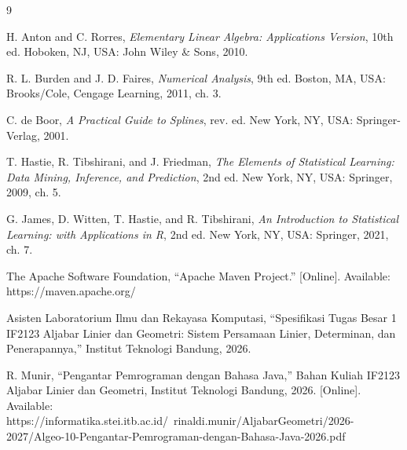 \clearpage
\begin{thebibliography}{9}

H. Anton and C. Rorres, \textit{Elementary Linear Algebra: Applications Version}, 10th ed. Hoboken, NJ, USA: John Wiley \& Sons, 2010.

R. L. Burden and J. D. Faires, \textit{Numerical Analysis}, 9th ed. Boston, MA, USA: Brooks/Cole, Cengage Learning, 2011, ch. 3.

C. de Boor, \textit{A Practical Guide to Splines}, rev. ed. New York, NY, USA: Springer-Verlag, 2001.

T. Hastie, R. Tibshirani, and J. Friedman, \textit{The Elements of Statistical Learning: Data Mining, Inference, and Prediction}, 2nd ed. New York, NY, USA: Springer, 2009, ch. 5.

G. James, D. Witten, T. Hastie, and R. Tibshirani, \textit{An Introduction to Statistical Learning: with Applications in R}, 2nd ed. New York, NY, USA: Springer, 2021, ch. 7.

The Apache Software Foundation, ``Apache Maven Project.'' [Online]. Available: https://maven.apache.org/

Asisten Laboratorium Ilmu dan Rekayasa Komputasi, ``Spesifikasi Tugas Besar 1 IF2123 Aljabar Linier dan Geometri: Sistem Persamaan Linier, Determinan, dan Penerapannya,'' Institut Teknologi Bandung, 2026.

R. Munir, ``Pengantar Pemrograman
dengan Bahasa Java,'' Bahan Kuliah IF2123 Aljabar Linier dan Geometri, Institut Teknologi Bandung, 2026. [Online]. Available: https://informatika.stei.itb.ac.id/~rinaldi.munir/AljabarGeometri/2026-2027/Algeo-10-Pengantar-Pemrograman-dengan-Bahasa-Java-2026.pdf

\end{thebibliography}
